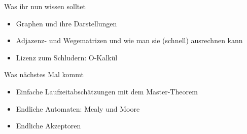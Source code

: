 \begin{frame}	
	\begin{block}{Was ihr nun wissen solltet}
		\begin{itemize}
			\item Graphen und ihre Darstellungen
			\item Adjazenz- und Wegematrizen und wie man sie (schnell) ausrechnen kann
			\item Lizenz zum Schludern: O-Kalkül
		\end{itemize}
	\end{block}
	
	\begin{block}{Was nächstes Mal kommt}
		\begin{itemize}
			\item Einfache Laufzeitabschätzungen mit dem Master-Theorem
			\item Endliche Automaten: Mealy und Moore
			\item Endliche Akzeptoren
		\end{itemize}
	\end{block}
\end{frame}


\slideThanks

